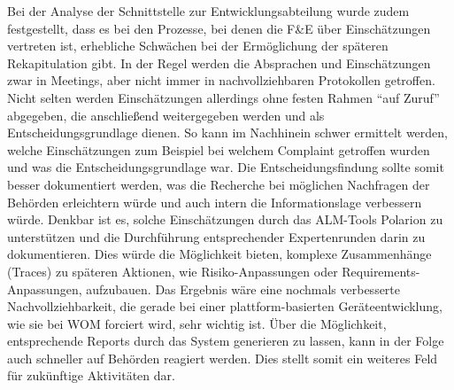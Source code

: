 \documentclass[a4paper,12pt]{report}
\begin{document}
Bei der Analyse der Schnittstelle zur Entwicklungsabteilung wurde zudem festgestellt, dass es bei den Prozesse, bei denen die F\&E über Einschätzungen vertreten ist, erhebliche Schwächen bei der Ermöglichung der späteren Rekapitulation gibt. In der Regel werden die Absprachen und Einschätzungen zwar in Meetings, aber nicht immer in nachvollziehbaren Protokollen getroffen. Nicht selten werden Einschätzungen allerdings ohne festen Rahmen "`auf Zuruf"' abgegeben, die anschließend weitergegeben werden und als Entscheidungsgrundlage dienen. So kann im Nachhinein schwer ermittelt werden, welche Einschätzungen zum Beispiel bei welchem Complaint getroffen wurden und was die Entscheidungsgrundlage war. Die Entscheidungsfindung sollte somit besser dokumentiert werden, was die Recherche bei möglichen Nachfragen der Behörden erleichtern würde und auch intern die Informationslage verbessern würde. Denkbar ist es, solche Einschätzungen durch das ALM-Tools Polarion zu unterstützen und die Durchführung entsprechender Expertenrunden darin zu dokumentieren. Dies würde die Möglichkeit bieten, komplexe Zusammenhänge (Traces) zu späteren Aktionen, wie Risiko-Anpassungen oder Requirements-Anpassungen, aufzubauen. Das Ergebnis wäre eine nochmals verbesserte Nachvollziehbarkeit, die gerade bei einer plattform-basierten Geräteentwicklung, wie sie bei WOM forciert wird, sehr wichtig ist. Über die Möglichkeit, entsprechende Reports durch das System generieren zu lassen, kann in der Folge auch schneller auf Behörden reagiert werden. Dies stellt somit ein weiteres Feld für zukünftige Aktivitäten dar.
  
\end{document}
